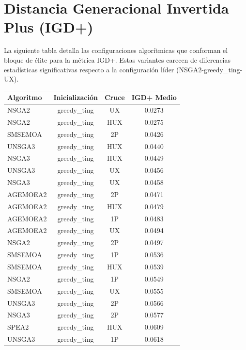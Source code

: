 \section{Distancia Generacional Invertida Plus (IGD+)}\label{anexo:elite_igd}

La siguiente tabla detalla las configuraciones algorítmicas que conforman el bloque de élite para la métrica IGD+. Estas variantes carecen de diferencias estadísticas significativas respecto a la configuración líder (NSGA2-greedy\_ting-UX).

\begin{table}[H]
    \centering
    \begin{tabular}{lccc}
        \toprule
        \textbf{Algoritmo} & \textbf{Inicialización} & \textbf{Cruce} & \textbf{IGD+ Medio} \\
        \midrule
        NSGA2 & greedy\_ting & UX & 0.0273 \\
        NSGA2 & greedy\_ting & HUX & 0.0275 \\
        SMSEMOA & greedy\_ting & 2P & 0.0426 \\
        UNSGA3 & greedy\_ting & HUX & 0.0440 \\
        NSGA3 & greedy\_ting & HUX & 0.0449 \\
        UNSGA3 & greedy\_ting & UX & 0.0456 \\
        NSGA3 & greedy\_ting & UX & 0.0458 \\
        AGEMOEA2 & greedy\_ting & 2P & 0.0471 \\
        AGEMOEA2 & greedy\_ting & HUX & 0.0479 \\
        AGEMOEA2 & greedy\_ting & 1P & 0.0483 \\
        AGEMOEA2 & greedy\_ting & UX & 0.0494 \\
        NSGA2 & greedy\_ting & 2P & 0.0497 \\
        SMSEMOA & greedy\_ting & 1P & 0.0536 \\
        SMSEMOA & greedy\_ting & HUX & 0.0539 \\
        NSGA2 & greedy\_ting & 1P & 0.0549 \\
        SMSEMOA & greedy\_ting & UX & 0.0555 \\
        UNSGA3 & greedy\_ting & 2P & 0.0566 \\
        NSGA3 & greedy\_ting & 2P & 0.0577 \\
        SPEA2 & greedy\_ting & HUX & 0.0609 \\
        UNSGA3 & greedy\_ting & 1P & 0.0618 \\

\end{tabular}
\end{table}
